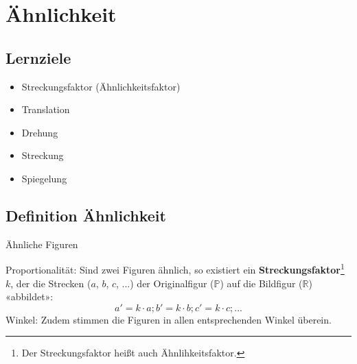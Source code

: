 
\section{Ähnlichkeit}




\subsection*{Lernziele}

\begin{itemize}
\item Streckungsfaktor (Ähnlichkeitsfaktor)
\item Translation
\item Drehung
\item Streckung
\item Spiegelung
\end{itemize}
\newpage




\subsection{Definition Ähnlichkeit}



\begin{definition}{Ähnliche Figuren}{}
  
Proportionalität: Sind zwei Figuren ähnlich, so existiert ein
\textbf{Streckungsfaktor}\footnote{Der
  Streckungsfaktor heißt auch Ähnlihkeitsfaktor.}
$k$, der die Strecken ($a$, $b$, $c$, ...) der Originalfigur
($\mathbb{P}$) auf die Bildfigur ($\mathbb{R}$) «abbildet»:
$$a' = k\cdot{}a; b' = k\cdot{}b; c' = k\cdot{} c; ...$$
Winkel: Zudem stimmen die Figuren in allen entsprechenden Winkel überein.
\end{definition}

